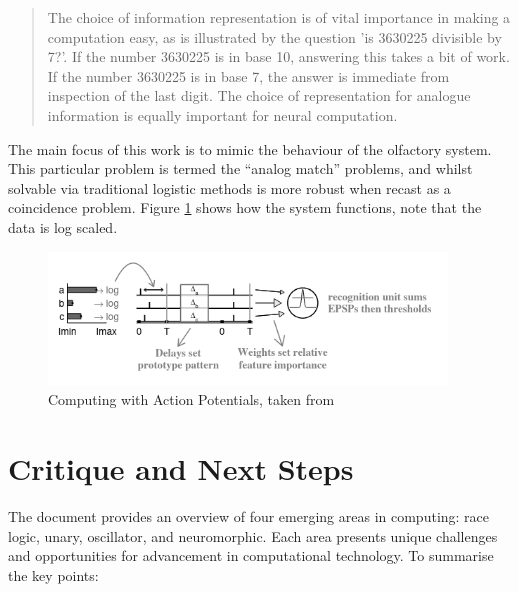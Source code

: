 \documentclass{article}
\begin{document}
\begin{quote}
	The choice of information representation is of vital importance in making a computation easy, as is illustrated by the question 'is 3630225 divisible by 7?'. If the number 3630225 is in base 10, answering this takes a bit of work. If the number 3630225 is in base 7, the answer is immediate from inspection of the last digit. The choice of representation for analogue information is equally important for neural computation. \cite{hopfield1995pattern}
\end{quote}

The main focus of this work is to mimic the behaviour of the olfactory system. This particular problem is termed the ``analog match'' problems, and whilst solvable via traditional logistic methods is more robust when recast as a coincidence problem. Figure \ref{fig:carlos} shows how the system functions, note that the data is log scaled.

\begin{figure}
	\centerline{\includegraphics[width=300pt]{figures/carlos.png}}
	\caption{Computing with Action Potentials, taken from \cite{hopfield1995pattern}}\label{fig:carlos}
\end{figure}

\section{Critique and Next Steps}

The document provides an overview of four emerging areas in computing: race logic, unary, oscillator, and neuromorphic. Each area presents unique challenges and opportunities for advancement in computational technology. To summarise the key points:
\end{document}
